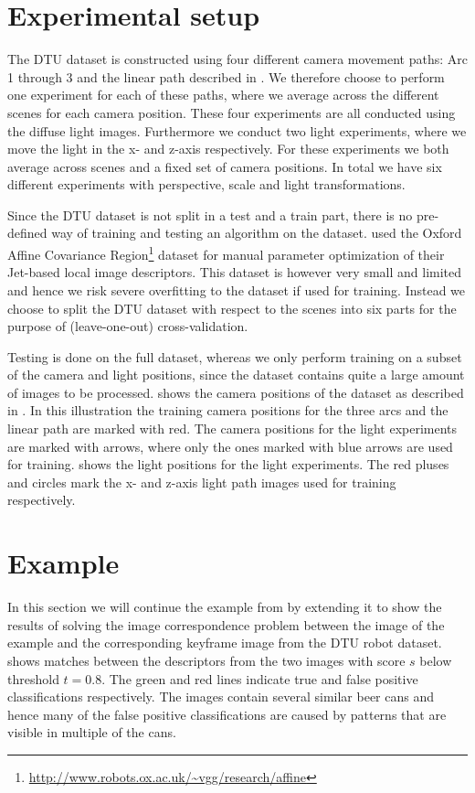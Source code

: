 \documentclass[thesis.tex]{subfiles}
\begin{document}
\section{Experimental setup}
%
The DTU dataset is constructed using four different camera movement paths: Arc 1 through 3 and the linear path described in . We therefore choose to perform one experiment for each of these paths, where we average across the different scenes for each camera position. These four experiments are all conducted using the diffuse light images. Furthermore we conduct two light experiments, where we move the light in the x- and z-axis respectively. For these experiments we both average across scenes and a fixed set of camera positions. In total we have six different experiments with perspective, scale and light transformations.

Since the DTU dataset is not split in a test and a train part, there is no pre-defined way of training and testing an algorithm on the dataset. \citet{larsen2012jet} used the Oxford Affine Covariance Region\footnote{\url{http://www.robots.ox.ac.uk/~vgg/research/affine}} dataset for manual parameter optimization of their Jet-based local image descriptors. This dataset is however very small and limited and hence we risk severe overfitting to the dataset if used for training. Instead we choose to split the DTU dataset with respect to the scenes into six parts for the purpose of (leave-one-out) cross-validation.

Testing is done on the full dataset, whereas we only perform training on a subset of the camera and light positions, since the dataset contains quite a large amount of images to be processed.  shows the camera positions of the dataset as described in . In this illustration the training camera positions for the three arcs and the linear path are marked with red. The camera positions for the light experiments are marked with arrows, where only the ones marked with blue arrows are used for training.  shows the light positions for the light experiments. The red pluses and circles mark the x- and z-axis light path images used for training respectively.
%
\section{Example}
%
In this section we will continue the example from  by extending it to show the results of solving the image correspondence problem between the image of the example and the corresponding keyframe image from the DTU robot dataset.
 shows matches between the descriptors from the two images with score $s$ below threshold $t = 0.8$. The green and red lines indicate true and false positive classifications respectively. The images contain several similar beer cans and hence many of the false positive classifications are caused by patterns that are visible in multiple of the cans.
\end{document}
